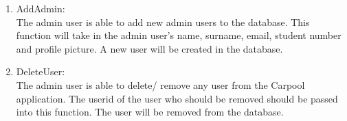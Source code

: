 \documentclass[hidelinks, 12pt, a4paper]{article}
\begin{document}
\begin{enumerate}[label=U1.\arabic*]
                \item AddAdmin:\\
                	The admin user is able to add new admin users to the database. This function will take in the admin user’s name, surname, email, student number and profile picture. A new user will be created in the database.
                	
                \item DeleteUser: \\
                    The admin user is able to delete/ remove any user from the Carpool application. The userid of the user who should be removed should be passed into this function. The user will be removed from the database.
                
            \end{enumerate}







    
\end{document}
